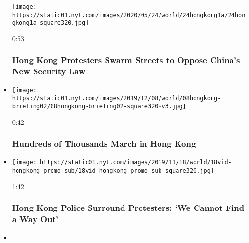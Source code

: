 \begin{itemize}
  \texttt{[image: https://static01.nyt.com/images/2020/05/24/world/24hongkong1a/24hongkong1a-square320.jpg]}

  0:53

  \hypertarget{hong-kong-protesters-swarm-streets-to-oppose-chinas-new-security-law}{%
  \subsubsection{Hong Kong Protesters Swarm Streets to Oppose China's
  New Security
  Law}\label{hong-kong-protesters-swarm-streets-to-oppose-chinas-new-security-law}}
\item
  \href{https://www.nytimes.com/video/world/asia/100000006864463/hong-kong-protests-video.html?action=click\&module=video-series-bar\&region=header\&pgtype=Article\&playlistId=video/hk-protest}{}

  \texttt{[image: https://static01.nyt.com/images/2019/12/08/world/08hongkong-briefing02/08hongkong-briefing02-square320-v3.jpg]}

  0:42

  \hypertarget{hundreds-of-thousands-march-in-hong-kong}{%
  \subsubsection{Hundreds of Thousands March in Hong
  Kong}\label{hundreds-of-thousands-march-in-hong-kong}}
\item
  \href{https://www.nytimes.com/video/world/asia/100000006830253/hong-kong-protests.html?action=click\&module=video-series-bar\&region=header\&pgtype=Article\&playlistId=video/hk-protest}{}

  \texttt{[image: https://static01.nyt.com/images/2019/11/18/world/18vid-hongkong-promo-sub/18vid-hongkong-promo-sub-square320.jpg]}

  1:42

  \hypertarget{hong-kong-police-surround-protesters-we-cannot-find-a-way-out}{%
  \subsubsection{Hong Kong Police Surround Protesters: `We Cannot Find a
  Way
  Out'}\label{hong-kong-police-surround-protesters-we-cannot-find-a-way-out}}
\item
  \href{https://www.nytimes.com/video/world/asia/100000006804020/hong-kong-protests-damage-office-of-chinas-state-run-news-agency.html?action=click\&module=video-series-bar\&region=header\&pgtype=Article\&playlistId=video/hk-protest}{}


\end{itemize}
